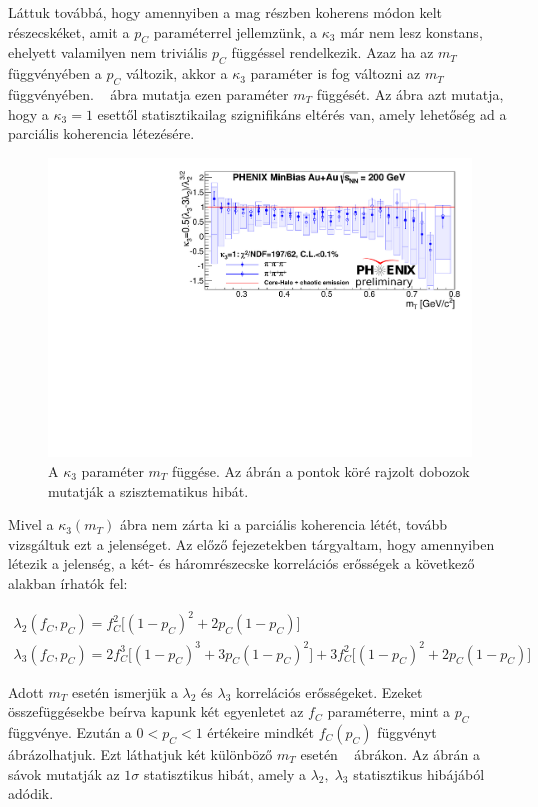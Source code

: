 \documentclass[11pt,a4paper]{article}
\numberwithin{equation}{subsection}
\numberwithin{figure}{section}
\begin{document}
Láttuk továbbá, hogy amennyiben a mag részben koherens módon kelt részecskéket, amit a $p_C$ paraméterrel jellemzünk, a $\kappa_3$ már nem lesz konstans, ehelyett valamilyen nem triviális $p_C$ függéssel rendelkezik. Azaz ha az $m_T$ függvényében a $p_C$ változik, akkor a $\kappa_3$ paraméter is fog változni az $m_T$ függvényében. ~ ábra mutatja ezen paraméter $m_T$ függését. Az ábra azt mutatja, hogy a $\kappa_3=1$ esettől statisztikailag szignifikáns eltérés van, amely lehetőség ad a parciális koherencia létezésére.

\begin{figure}[H]
\centering
\includegraphics[scale=0.75]{pic/res/kappa3.pdf}
\caption{A $\kappa_3$ paraméter $m_T$ függése. Az ábrán a pontok köré rajzolt dobozok mutatják a szisztematikus hibát.}
\label{fig:kappa3}
\end{figure}

Mivel a $\kappa_3(m_T)$ ábra nem zárta ki a parciális koherencia létét, tovább vizsgáltuk ezt a jelenséget. Az előző fejezetekben tárgyaltam, hogy amennyiben létezik a jelenség, a két- és háromrészecske korrelációs erősségek a következő alakban írhatók fel:

\begin{equation}
\begin{aligned}
\lambda_2(f_C, p_C) =  f_C^2\big[(1-p_C)^2+2p_C(1-p_C)\big]\\
\lambda_3(f_C, p_C) =  2f_C^3\big[(1-p_C)^3+3p_C(1-p_C)^2\big]+3f_C^2\big[(1-p_C)^2+2p_C(1-p_C)\big]
\end{aligned}
\label{eq:l2l3}
\end{equation}

Adott $m_T$ esetén ismerjük a $\lambda_2$ és $\lambda_3$ korrelációs erősségeket. Ezeket ~ összefüggésekbe beírva kapunk két egyenletet az $f_C$ paraméterre, mint a $p_C$ függvénye. Ezután a $0<p_C<1$ értékeire mindkét $f_C(p_C)$ függvényt ábrázolhatjuk. Ezt láthatjuk két különböző $m_T$ esetén ~ ábrákon. Az ábrán a sávok mutatják az $1\sigma$ statisztikus hibát, amely a $\lambda_2,\;\lambda_3$ statisztikus hibájából adódik.
\end{document}

